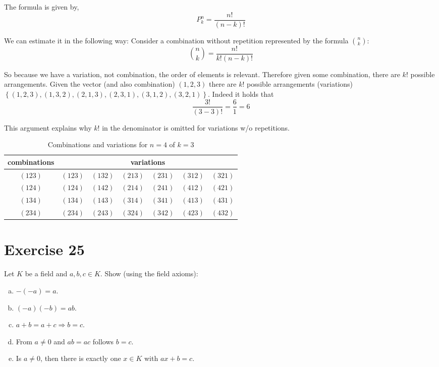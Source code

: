 \documentclass[a4paper]{article}
\theoremstyle{definition}
\newcommand\set[1]{\left\{#1\right\}}
\begin{document}
The formula is given by,
\[ P_k^n = \frac{n!}{(n-k)!} \]

We can estimate it in the following way:
Consider a combination without repetition represented by the formula $n \choose k$:
\[ {n \choose k} = \frac{n!}{k! (n - k)!} \]

So because we have a variation, not combination, the order of elements is relevant.
Therefore given some combination, there are $k!$ possible arrangements. Given the vector
(and also combination) $(1, 2, 3)$ there are $k!$ possible arrangements (variations)
$\set{(1, 2, 3), (1, 3, 2), (2, 1, 3), (2, 3, 1), (3, 1, 2), (3, 2, 1)}$.
Indeed it holds that
\[ \frac{3!}{(3 - 3)!} = \frac61 = 6 \]

This argument explains why $k!$ in the denominator is omitted for variations w/o repetitions.

\begin{table}[!h]
  \begin{center}
    \begin{tabular}{c|cccccc}
      combinations & \multicolumn{6}{c}{variations} \\
    \hline
      $(123)$ & $(123)$ & $(132)$ & $(213)$ & $(231)$ & $(312)$ & $(321)$ \\
      $(124)$ & $(124)$ & $(142)$ & $(214)$ & $(241)$ & $(412)$ & $(421)$ \\
      $(134)$ & $(134)$ & $(143)$ & $(314)$ & $(341)$ & $(413)$ & $(431)$ \\
      $(234)$ & $(234)$ & $(243)$ & $(324)$ & $(342)$ & $(423)$ & $(432)$
    \end{tabular}
    \caption{Combinations and variations for $n=4$ of $k=3$}
  \end{center}
\end{table}

\section{Exercise 25}
\begin{ex}
  Let $K$ be a field and $a,b,c \in K$. Show (using the field axioms):
  \begin{enumerate}[(a)]
    \item $-(-a) = a$.
    \item $(-a)(-b) = ab$.
    \item $a + b = a + c \Rightarrow b = c$.
    \item From $a \neq 0$ and $ab = ac$ follows $b = c$.
    \item Is $a \neq 0$, then there is exactly one $x \in K$ with $ax + b = c$.
  \end{enumerate}
\end{ex}
\end{document}

